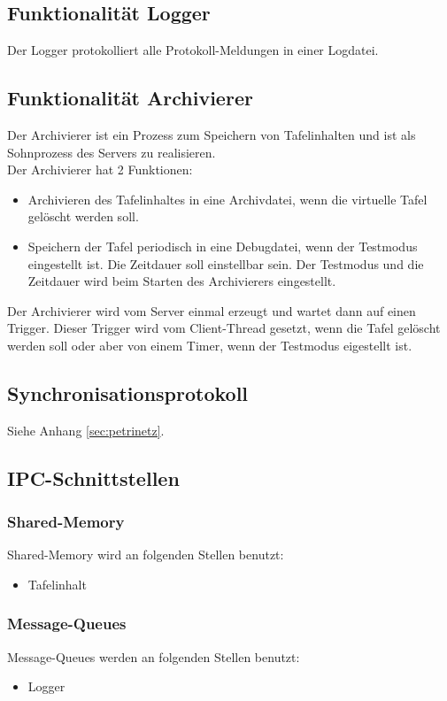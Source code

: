 \subsection{Funktionalität Logger}
Der Logger protokolliert alle Protokoll-Meldungen in einer Logdatei.

\subsection{Funktionalität Archivierer}
Der Archivierer ist ein Prozess zum Speichern von Tafelinhalten und ist als Sohnprozess des Servers zu realisieren. \\
Der Archivierer hat 2 Funktionen:
\begin{itemize}
 \item Archivieren des Tafelinhaltes in eine Archivdatei, wenn die virtuelle Tafel gelöscht werden soll.
 \item Speichern der Tafel periodisch in eine Debugdatei, wenn der Testmodus eingestellt ist. Die Zeitdauer soll 
einstellbar sein. Der Testmodus und die Zeitdauer wird beim Starten des Archivierers eingestellt.
\end{itemize}
Der Archivierer wird vom Server einmal erzeugt und wartet dann auf einen Trigger. Dieser Trigger wird vom Client-Thread 
gesetzt, wenn die Tafel gelöscht werden soll oder aber von einem Timer, wenn der Testmodus eigestellt ist.

\subsection{Synchronisationsprotokoll}
Siehe Anhang \ref{sec:petrinetz}.

\subsection{IPC-Schnittstellen}

\subsubsection{Shared-Memory}
Shared-Memory wird an folgenden Stellen benutzt:
\begin{itemize}
 \item Tafelinhalt
\end{itemize}

\subsubsection{Message-Queues}
Message-Queues werden an folgenden Stellen benutzt:
\begin{itemize}
 \item Logger
\end{itemize}
